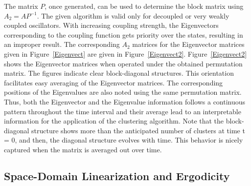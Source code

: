 The matrix $P$, once generated, can be used to determine the block matrix using $A_2 = A P^{-1}$. The given algorithm is valid only for decoupled or very weakly coupled oscillators. With increasing coupling strength, the Eigenvectors corresponding to the coupling function gets priority over the states, resulting in an improper result. The corresponding $A_2$ matrices for the Eigenvector matrices given in Figure~\ref{Eigenvect} are given in Figure~\ref{Eigenvect2}. Figure~\ref{Eigenvect2} shows the Eigenvector matrices when operated under the obtained permutation matrix. The figures indicate clear block-diagonal structures. This orientation facilitates easy averaging of the Eigenvector matrices. The corresponding positions of the Eigenvalues are also noted using the same permutation matrix. Thus, both the Eigenvector and the Eigenvalue information follows a continuous pattern throughout the time interval and their average lead to an interpretable information for the application of the clustering algorithm. Note that the block-diagonal structure shows more than the anticipated number of clusters at time t = 0, and then, the diagonal structure evolves with time. This behavior is nicely captured when the matrix is averaged out over time. 

\subsection{Space-Domain Linearization and Ergodicity}
\label{stat_lin_section}

